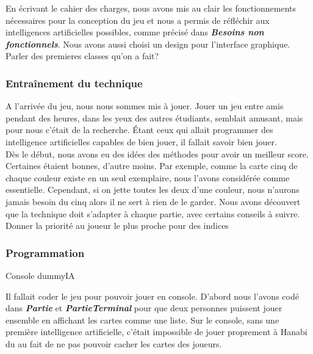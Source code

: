 \documentclass[11pt, letterpaper]{article}
\begin{document}
\noindent En écrivant le cahier des charges, nous avons mis au clair les fonctionnements nécessaires pour la conception du jeu et nous a permis de réfléchir aux intelligences artificielles possibles, comme précisé dans \textbf{\textit{Besoins non fonctionnels}}. Nous avons aussi choisi un design pour l'interface graphique.\\

\noindent Parler des premieres classes qu'on a fait?

\subsubsection{Entraînement du technique}

\noindent A l'arrivée du jeu, nous nous sommes mis à jouer. Jouer un jeu entre amis pendant des heures, dans les yeux des autres étudiants, semblait amusant, mais pour nous c'était de la recherche. Étant ceux qui allait programmer des intelligence artificielles capables de bien jouer, il fallait savoir bien jouer. \\

\noindent Dès le début, nous avons eu des idées des méthodes pour avoir un meilleur score. Certaines étaient bonnes, d'autre moins. Par exemple, comme la carte cinq de chaque couleur existe en un seul exemplaire, nous l'avons considérée comme essentielle. Cependant, si on jette toutes les deux d'une couleur, nous n'aurons jamais besoin du cinq alors il ne sert à rien de le garder. Nous avons découvert que la technique doit s'adapter à chaque partie, avec certains conseils à suivre. \\

\noindent Donner la priorité au joueur le plus proche pour des indices\\

\noindent 

\subsubsection{Programmation}

\noindent Console dummyIA

\noindent Il fallait coder le jeu pour pouvoir jouer en console. D'abord nous l'avons codé dans \textbf{\textit{Partie}} et \textbf{\textit{PartieTerminal}} pour que deux personnes puissent jouer ensemble en affichant les cartes comme une liste. Sur le console, sans une première intelligence artificielle, c'était impossible de jouer proprement à Hanabi du au fait de ne pas pouvoir cacher les cartes des joueurs.\\
\end{document}

